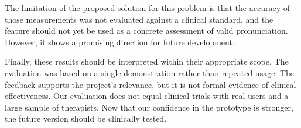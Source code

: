 The limitation of the proposed solution for this problem is that the accuracy of those measurements was not evaluated against a clinical standard, and the feature should not yet be used as a concrete assessment of valid pronunciation. However, it shows a promising direction for future development.

Finally, these results should be interpreted within their appropriate scope. The evaluation was based on a single demonstration rather than repeated usage. The feedback supports the project's relevance, but it is not formal evidence of clinical effectiveness. Our evaluation does not equal clinical trials with real users and a large sample of therapists. Now that our confidence in the prototype is stronger, the future version should be clinically tested.